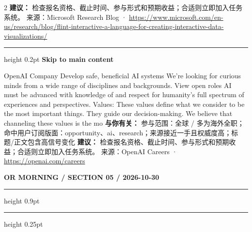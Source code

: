 \documentclass[10.5pt]{ctexart}
\begin{document}
\begin{multicols}{2}
\textbf{建议：} 检查报名资格、截止时间、参与形式和预期收益；合适则立即加入任务系统。
{\footnotesize\color{ormuted} 来源：Microsoft Research Blog · \url{https://www.microsoft.com/en-us/research/blog/flint-interactive-a-language-for-creating-interactive-data-visualizations/}}
\vspace{2mm}
\hrule height 0.2pt
\vspace{2mm}
{\large\bfseries Skip to main content}\par
OpenAI Company Develop safe, beneficial AI systems We’re looking for curious minds from a wide range of disciplines and backgrounds. View open roles AI must be advanced with knowledge of and respect for humanity’s full spectrum of experiences and perspectives. Values: These values define what we consider to be the most important things. They guide our decision-making. We believe that channeling these values is the mo
\textbf{与你有关：} 参与范围：全球 / 多为海外全职；命中用户订阅版面：opportunity、ai、research；来源接近一手且权威度高；标题/正文包含高信号变化
\textbf{建议：} 检查报名资格、截止时间、参与形式和预期收益；合适则立即加入任务系统。
{\footnotesize\color{ormuted} 来源：OpenAI Careers · \url{https://openai.com/careers}}
\end{multicols}
\newpage
{\small\bfseries OR MORNING / SECTION 05 / 2026-10-30}
\vspace{2mm}
\hrule height 0.9pt
\vspace{1.5mm}
\hrule height 0.25pt
\vspace{4mm}
\end{document}
